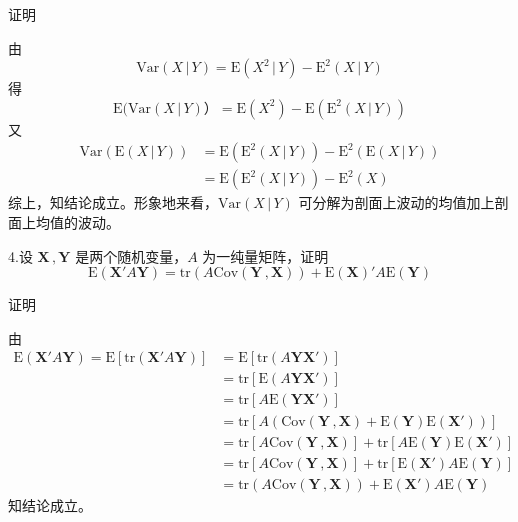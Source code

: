 \documentclass[12pt,hyperref,]{ctexart}
\begin{document}
\vspace{1em}

\heiti

证明

\songti

由 \begin{equation*}
\mathrm{Var}(X\, |\,Y)=\mathrm{E}(X^2\,|\,Y)-\mathrm{E}^2(X\, |\,Y) 
\end{equation*}得 \begin{equation*}
\mathrm{E}(\mathrm{Var}(X\, |\,Y)）=\mathrm{E}(X^2)-\mathrm{E}(\mathrm{E}^2(X\, |\,Y)) 
\end{equation*}又 \begin{equation*}
\begin{aligned}
\mathrm{Var}(\mathrm{E}(X\, |\,Y))&=\mathrm{E}(\mathrm{E}^2(X\,|\,Y))-\mathrm{E}^2(\mathrm{E}(X\,|\,Y)) \\
&=\mathrm{E}(\mathrm{E}^2(X\,|\,Y))-\mathrm{E}^2(X)
\end{aligned}
\end{equation*}综上，知结论成立。形象地来看，\(\mathrm{Var}(X\,|\,Y)\)
可分解为剖面上波动的均值加上剖面上均值的波动。

\vspace{3em}

\kaishu

4.设 \(\mathbf{X}\, ,\mathbf{Y}\) 是两个随机变量，\(A\)
为一纯量矩阵，证明 \begin{equation*}
\mathrm{E}(\mathbf{X}'A\mathbf{Y})=\mathrm{tr}(A\mathrm{Cov}(\mathbf{Y}\, ,\mathbf{X}))+\mathrm{E}(\mathbf{X})'A\mathrm{E}(\mathbf{Y})
\end{equation*}

\vspace{1em}

\heiti

证明

\songti

由 \begin{equation*}
\begin{aligned}
\mathrm{E}(\mathbf{X}'A\mathbf{Y})=\mathrm{E}[\mathrm{tr}(\mathbf{X}'A\mathbf{Y})]&=\mathrm{E}[\mathrm{tr}(A\mathbf{Y}\mathbf{X}')] \\
&=\mathrm{tr}[\mathrm{E}(A\mathbf{Y}\mathbf{X}')] \\
&=\mathrm{tr}[A\mathrm{E}(\mathbf{Y}\mathbf{X}')] \\
&=\mathrm{tr}[A(\mathrm{Cov}(\mathbf{Y}\, ,\mathbf{X})+\mathrm{E}(\mathbf{Y})\mathrm{E}(\mathbf{X}'))] \\
&=\mathrm{tr}[A\mathrm{Cov}(\mathbf{Y}\, ,\mathbf{X})]+\mathrm{tr}[A\mathrm{E}(\mathbf{Y})\mathrm{E}(\mathbf{X}')] \\
&=\mathrm{tr}[A\mathrm{Cov}(\mathbf{Y}\, ,\mathbf{X})]+\mathrm{tr}[\mathrm{E}(\mathbf{X}')A\mathrm{E}(\mathbf{Y})] \\
&=\mathrm{tr}(A\mathrm{Cov}(\mathbf{Y}\, ,\mathbf{X}))+\mathrm{E}(\mathbf{X}')A\mathrm{E}(\mathbf{Y})
\end{aligned}
\end{equation*}知结论成立。
\end{document}

